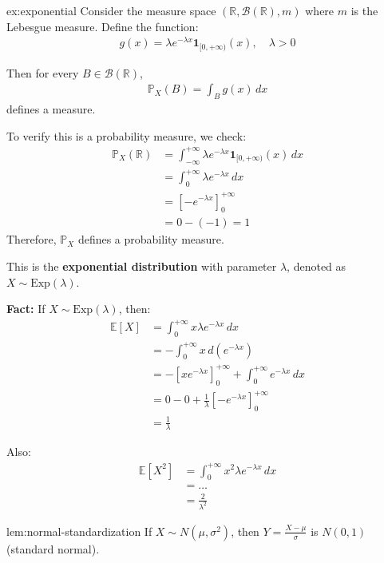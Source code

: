     \begin{example}{ex:exponential}
        Consider the measure space $(\mathbb{R}, \mathcal{B}(\mathbb{R}), m)$ where $m$ is the Lebesgue measure. Define the function:
        \begin{align*}
        g(x) = \lambda e^{-\lambda x} \mathbf{1}_{[0,+\infty)}(x), \quad \lambda > 0
        \end{align*}
        
        Then for every $B \in \mathcal{B}(\mathbb{R})$, 
        \begin{align*}
        \mathbb{P}_X(B) = \int_B g(x) \, dx
        \end{align*}
        defines a measure.
        
        To verify this is a probability measure, we check:
        \begin{align*}
        \mathbb{P}_X(\mathbb{R}) &= \int_{-\infty}^{+\infty} \lambda e^{-\lambda x} \mathbf{1}_{[0,+\infty)}(x) \, dx \\
        &= \int_0^{+\infty} \lambda e^{-\lambda x} \, dx \\
        &= \left[ -e^{-\lambda x} \right]_0^{+\infty} \\
        &= 0 - (-1) = 1
        \end{align*}
        Therefore, $\mathbb{P}_X$ defines a probability measure.
        
        This is the \textbf{exponential distribution} with parameter $\lambda$, denoted as $X \sim \text{Exp}(\lambda)$.
        
        \textbf{Fact:} If $X \sim \text{Exp}(\lambda)$, then:
        \begin{align*}
        \mathbb{E}[X] &= \int_0^{+\infty} x \lambda e^{-\lambda x} \, dx \\
        &= -\int_0^{+\infty} x \, d(e^{-\lambda x}) \\
        &= -\left[ x e^{-\lambda x} \right]_0^{+\infty} + \int_0^{+\infty} e^{-\lambda x} \, dx \\
        &= 0 - 0 + \frac{1}{\lambda} \left[ -e^{-\lambda x} \right]_0^{+\infty} \\
        &= \frac{1}{\lambda}
        \end{align*}
        
        Also:
        \begin{align*}
        \mathbb{E}[X^2] &= \int_0^{+\infty} x^2 \lambda e^{-\lambda x} \, dx \\
        &= \ldots \\
        &= \frac{2}{\lambda^2}
        \end{align*}
        \end{example}
        \begin{lemma}{lem:normal-standardization}
            If $X \sim N(\mu, \sigma^2)$, then $Y = \frac{X-\mu}{\sigma}$ is $N(0,1)$ (standard normal).
            \end{lemma}
            
